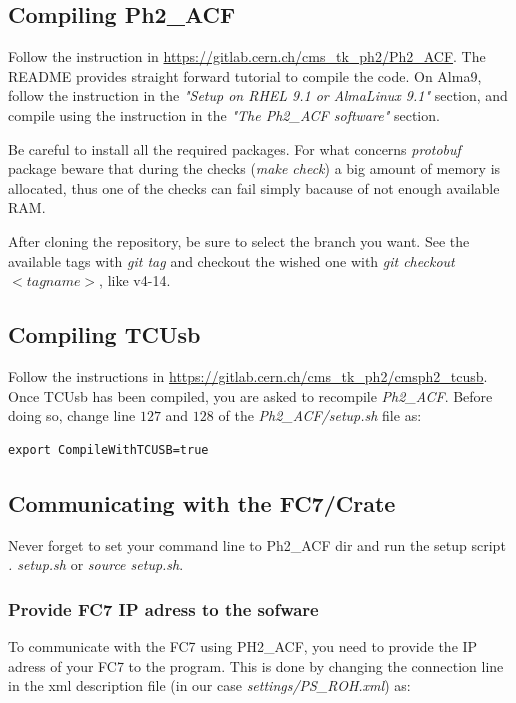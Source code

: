 \documentclass[10pt,a4paper]{article}
\begin{document}
\subsection{Compiling Ph2\_ACF}
Follow the instruction in \url{https://gitlab.cern.ch/cms_tk_ph2/Ph2_ACF}. 
The README provides straight forward tutorial to compile the code. On Alma9, follow the instruction in the \emph{"Setup on RHEL 9.1 or AlmaLinux 9.1"} section, and compile using the instruction in the \emph{"The Ph2\_ACF software"} section.

Be careful to install all the required packages. For what concerns {\it protobuf} package beware that during the checks (\emph{make check}) a big amount of memory is allocated, thus one of the checks can fail simply bacause of not enough available RAM.  

After cloning the repository, be sure to select the branch you want. See the available tags with \emph{git tag} and checkout the wished one with \emph{git checkout $<tagname>$}, like v4-14.


\subsection{Compiling TCUsb}
Follow the instructions in \url{https://gitlab.cern.ch/cms_tk_ph2/cmsph2_tcusb}.
Once TCUsb has been compiled, you are asked to recompile \emph{Ph2\_ACF}. Before doing so, change line $127$ and $128$ of the \emph{Ph2\_ACF/setup.sh} file as:
\begin{framed}
\begin{verbatim}
export CompileWithTCUSB=true
\end{verbatim}
\end{framed}

\subsection{Communicating with the FC7/Crate}

Never forget to set your command line to Ph2\_ACF dir and run the setup script \emph{. setup.sh} or \emph{source setup.sh}.

\subsubsection{Provide FC7 IP adress to the sofware}
To communicate with the FC7 using PH2\_ACF, you need to provide the IP adress of your FC7 to the program. This is done by changing the connection line in the xml description file (in our case \emph{settings/PS\_ROH.xml}) as:
\end{document}
